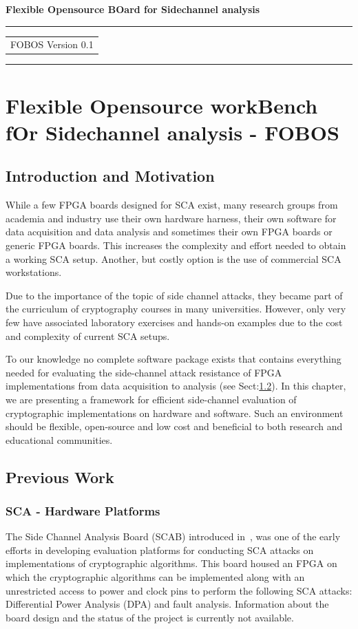 \documentclass{llncs}
\numberwithin{algorithm}{chapter}
\begin{document}
%
\begin{flushleft}
\LARGE\bfseries Flexible Opensource BOard for
Sidechannel analysis 
\end{flushleft}
\rule{\textwidth}{1pt}
\vspace{2pt}
\begin{flushright}
\Huge
\begin{tabular}{@{}l}
FOBOS
{\Large Version 0.1}
\end{tabular}
\end{flushright}
\rule{\textwidth}{1pt}
\vfill
%
\newpage
\tableofcontents
\newpage
\chapter{Flexible Opensource workBench fOr Sidechannel analysis - FOBOS}
\minitoc
\section{Introduction and Motivation}

While a few FPGA boards designed for SCA exist, many research groups from academia and
industry use their own hardware harness, their own software for data acquisition and data analysis
and sometimes their own FPGA boards or generic FPGA boards. This increases the complexity and
effort needed to obtain a working SCA setup. Another, but costly option is the use of
commercial SCA workstations.

Due to the importance of the topic of side channel attacks, they became part of 
the curriculum of cryptography courses in many universities. However, only very few have 
associated laboratory exercises and hands-on examples due to the cost and complexity
of current SCA setups. 

To our knowledge no complete software package exists that contains everything needed
for evaluating the side-channel attack resistance of FPGA implementations from 
data acquisition to analysis (see Sect:\ref{sec:previous}). In this chapter, we are presenting a 
framework
for efficient side-channel evaluation of cryptographic implementations on hardware and software. 
Such an environment should be flexible, open-source and low cost and beneficial to both
research and educational communities.


\section{Previous Work}\label{sec:previous}
\subsection{SCA - Hardware Platforms}\label{sec:SCAhw}
The Side Channel Analysis Board (SCAB) introduced in~\cite{2021}, was one of the early efforts in
developing evaluation platforms for conducting SCA attacks on implementations of cryptographic algorithms.
This board housed an FPGA on which the cryptographic algorithms can be implemented along with an unrestricted
access to power and clock pins to perform the following SCA attacks: 
Differential Power Analysis (DPA) and fault analysis. Information about the board design 
and the status of the project is currently not available.
\end{document}
